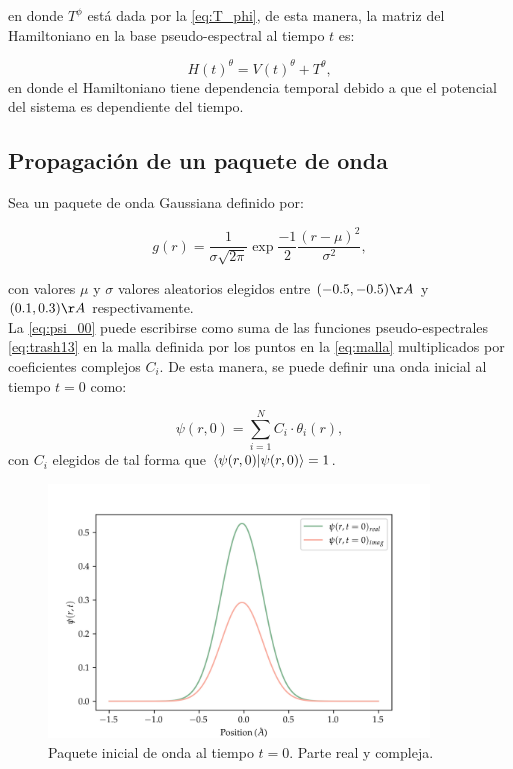 \noindent en donde $T^{\phi}$ está dada por la \autoref{eq:T_phi}, de esta manera, la matriz del Hamiltoniano en la base pseudo-espectral al tiempo $t$ es:

\begin{equation}
  \label{eq:H_DVR}
  H(t)^{\theta} = V(t)^{\theta}+T^{\theta},
\end{equation}
en donde el Hamiltoniano tiene dependencia temporal debido a que el potencial del sistema es dependiente del tiempo.

\subsection{Propagación de un paquete de onda}

Sea un paquete de onda Gaussiana definido por:

\begin{equation}
  \label{eq:psi_00}
g(r)=\frac{1}{\sigma\sqrt{2\pi}}\exp{\frac{-1}{2}\frac{(r-\mu)^2}{\sigma^2}},
\end{equation}

\noindent con valores $\mu$ y $\sigma$ valores aleatorios elegidos entre $(-0.5,-0.5)\AA$ y $(0.1,0.3)\AA$ respectivamente. \\

La \autoref{eq:psi_00} puede escribirse como suma de las funciones pseudo-espectrales \autoref{eq:trash13} en la malla definida por los puntos en la \autoref{eq:malla} multiplicados por coeficientes complejos $C_i$. De esta manera, se puede definir una onda inicial al tiempo $t=0$ como:

\begin{equation}
  \label{eq:psi_0}
\psi(r,0)=\sum_{i=1}^{N}C_i \cdot \theta_{i}(r),
\end{equation}
con $C_i$ elegidos de tal forma que $\bra{\psi(r,0)}\ket{\psi(r,0)}=1$.
\begin{figure}[!htbp]
  \centering
  \includegraphics[width=0.9\textwidth]{./img/psi_01}
  \caption{Paquete inicial de onda al tiempo $t=0$. Parte real y compleja.}
  \label{fig:psi_0}
\end{figure}


